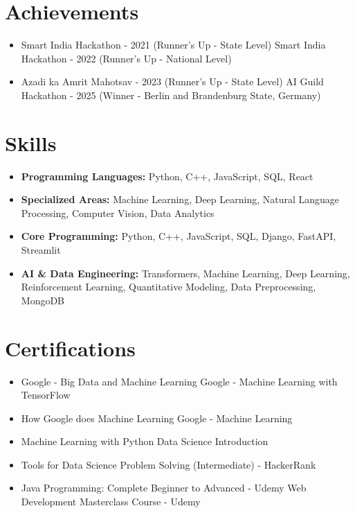\documentclass[a4paper,10pt]{article}
\begin{document}
\section*{Achievements}
\begin{itemize}
\item Smart India Hackathon - 2021 (Runner's Up - State Level) \hfill Smart India Hackathon - 2022 (Runner's Up - National Level)
\item Azadi ka Amrit Mahotsav - 2023 (Runner's Up - State Level) \hfill AI Guild Hackathon - 2025 (Winner - Berlin and Brandenburg State, Germany)
\end{itemize}

\section*{Skills}
\begin{itemize}
  \item \textbf{Programming Languages:} Python, C++, JavaScript, SQL, React
  \item \textbf{Specialized Areas:} Machine Learning, Deep Learning, Natural Language Processing, Computer Vision, Data Analytics
  \item \textbf{Core Programming:} Python, C++, JavaScript, SQL, Django, FastAPI, Streamlit
  \item \textbf{AI \& Data Engineering:} Transformers, Machine Learning, Deep Learning, Reinforcement Learning, Quantitative Modeling, Data Preprocessing, MongoDB
\end{itemize}

\section*{Certifications}
\begin{itemize}
\item Google - Big Data and Machine Learning \hfill Google - Machine Learning with TensorFlow
\item How Google does Machine Learning \hfill Google - Machine Learning
\item Machine Learning with Python \hfill Data Science Introduction
\item Tools for Data Science \hfill Problem Solving (Intermediate) - HackerRank
\item Java Programming: Complete Beginner to Advanced - Udemy \hfill Web Development Masterclass Course - Udemy
\end{itemize}
\end{document}
